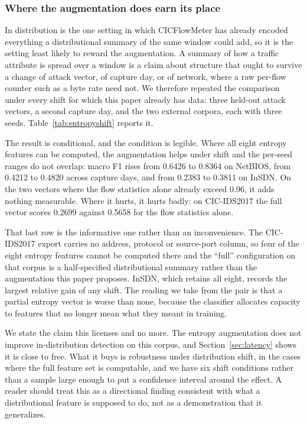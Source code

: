 \documentclass{ieeeaccess}
\begin{document}
\subsubsection{Where the augmentation does earn its place}
\label{sec:entropyshift}
In distribution is the one setting in which CICFlowMeter has already encoded
everything a distributional summary of the same window could add, so it is the
setting least likely to reward the augmentation. A summary of how a traffic
attribute is spread over a window is a claim about structure that ought to
survive a change of attack vector, of capture day, or of network, where a raw
per-flow counter such as a byte rate need not. We therefore repeated the
comparison under every shift for which this paper already has data: three
held-out attack vectors, a second capture day, and the two external corpora,
each with three seeds. Table~\ref{tab:entropyshift} reports it.

The result is conditional, and the condition is legible. Where all eight entropy
features can be computed, the augmentation helps under shift and the per-seed
ranges do not overlap: macro F1 rises from 0.6426 to 0.8364 on NetBIOS, from
0.4212 to 0.4820 across capture days, and from 0.2383 to 0.3811 on InSDN. On the
two vectors where the flow statistics alone already exceed 0.96, it adds nothing
measurable. Where it hurts, it hurts badly: on CIC-IDS2017 the full vector scores
0.2699 against 0.5658 for the flow statistics alone.

That last row is the informative one rather than an inconvenience. The
CIC-IDS2017 export carries no address, protocol or source-port column, so four of
the eight entropy features cannot be computed there and the ``full''
configuration on that corpus is a half-specified distributional summary rather
than the augmentation this paper proposes. InSDN, which retains all eight,
records the largest relative gain of any shift. The reading we take from the pair
is that a partial entropy vector is worse than none, because the classifier
allocates capacity to features that no longer mean what they meant in training.

We state the claim this licenses and no more. The entropy augmentation does not
improve in-distribution detection on this corpus, and Section~\ref{sec:latency}
shows it is close to free. What it buys is robustness under distribution shift,
in the cases where the full feature set is computable, and we have six shift
conditions rather than a sample large enough to put a confidence interval around
the effect. A reader should treat this as a directional finding consistent with
what a distributional feature is supposed to do, not as a demonstration that it
generalizes.
\end{document}
